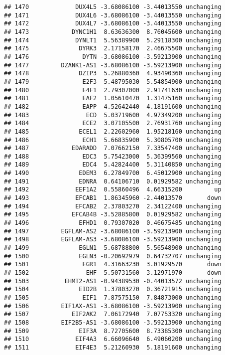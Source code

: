 \documentclass[]{article}
\begin{document}
\begin{verbatim}
## 1470             DUX4L5 -3.68086100 -3.44013550 unchanging
## 1471             DUX4L6 -3.68086100 -3.44013550 unchanging
## 1472             DUX4L7 -3.68086100 -3.44013550 unchanging
## 1473            DYNC1H1  8.63636300  8.76045600 unchanging
## 1474             DYNLT1  5.56389900  5.29118300 unchanging
## 1475              DYRK3  2.17158170  2.46675500 unchanging
## 1476               DYTN -3.68086100 -3.59213900 unchanging
## 1477         DZANK1-AS1 -3.68086100 -3.59213900 unchanging
## 1478              DZIP3  5.26880360  4.93490360 unchanging
## 1479               E2F3  5.48795030  5.54854900 unchanging
## 1480               E4F1  2.79307000  2.91741630 unchanging
## 1481               EAF2  1.05610470  1.31475160 unchanging
## 1482               EAPP  4.52642440  4.18191600 unchanging
## 1483                ECD  5.03719600  4.97349200 unchanging
## 1484               ECE2  3.07105500  2.76931760 unchanging
## 1485              ECEL1  2.22602960  1.95218160 unchanging
## 1486               ECH1  5.66835900  5.30805700 unchanging
## 1487            EDARADD  7.07662150  7.33547400 unchanging
## 1488               EDC3  5.75423000  5.36399560 unchanging
## 1489               EDC4  5.42824400  5.31140850 unchanging
## 1490              EDEM3  6.27849700  6.45012900 unchanging
## 1491              EDNRA  0.64106710  0.01929582 unchanging
## 1492             EEF1A2  0.55860496  4.66315200         up
## 1493             EFCAB1  1.86345960 -2.44013570       down
## 1494             EFCAB2  2.37803270  2.34122400 unchanging
## 1495            EFCAB4B -3.52885800  0.01929582 unchanging
## 1496              EFHD1  0.79307020  0.46675485 unchanging
## 1497         EGFLAM-AS2 -3.68086100 -3.59213900 unchanging
## 1498         EGFLAM-AS3 -3.68086100 -3.59213900 unchanging
## 1499              EGLN1  5.68788800  5.56548900 unchanging
## 1500              EGLN3 -0.20692979  0.64732707 unchanging
## 1501               EGR1  4.31663230  3.01929570       down
## 1502                EHF  5.50731560  3.12971970       down
## 1503          EHMT2-AS1 -0.94389530 -0.44013572 unchanging
## 1504              EID2B  1.37803270  0.36721915 unchanging
## 1505               EIF1  7.87575150  7.84873000 unchanging
## 1506         EIF1AX-AS1 -3.68086100 -3.59213900 unchanging
## 1507            EIF2AK2  7.06172940  7.07753320 unchanging
## 1508         EIF2B5-AS1 -3.68086100 -3.59213900 unchanging
## 1509              EIF3A  8.72705600  8.73385300 unchanging
## 1510             EIF4A3  6.66096640  6.49060200 unchanging
## 1511             EIF4E3  5.21260930  5.18191600 unchanging

\end{verbatim}
\end{document}
